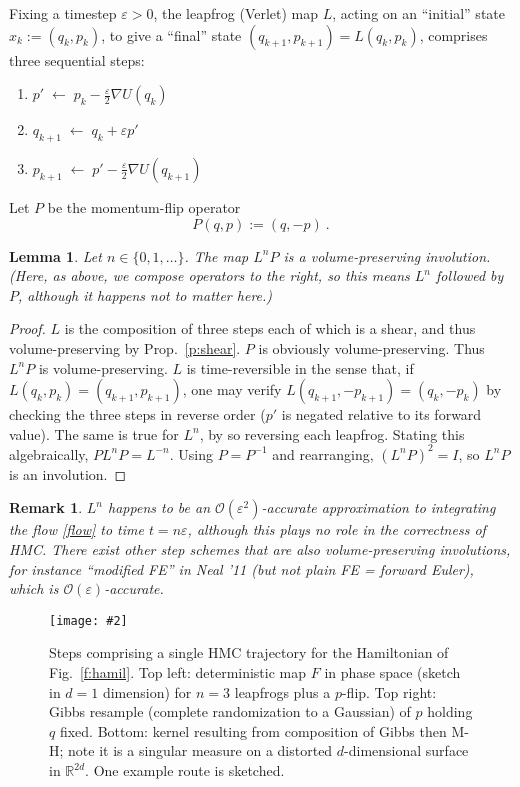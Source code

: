 \documentclass[10pt]{article}
\newcommand{\ben}{\begin{enumerate}}
\newcommand{\een}{\end{enumerate}}
\newcommand{\bfi}{\begin{figure}}
\newcommand{\efi}{\end{figure}}
\newcommand{\ca}[2]{\caption{#1 \label{#2}}}
\newcommand{\ig}[2]{\texttt{[image: \#2]}}
\newcommand{\R}{\mathbb{R}}
\newcommand{\bigO}{{\mathcal O}}
\newtheorem{lem}[thm]{Lemma}
\newtheorem{rmk}[thm]{Remark}
\newcommand{\eps}{\varepsilon}
\begin{document}
Fixing a timestep $\eps>0$, the leapfrog (Verlet) map $L$,
acting on an ``initial'' state $x_k:=(q_k,p_k)$,
to give a ``final'' state $(q_{k+1},p_{k+1}) = L(q_k,p_k)$,
comprises three sequential steps:
\ben
\item $p'     \;\leftarrow\; p_k - \frac{\eps}{2} \nabla U(q_k)$
\item $q_{k+1} \;\leftarrow\; q_k + \eps p'$
\item $p_{k+1} \;\leftarrow\; p' - \frac{\eps}{2} \nabla U(q_{k+1})$
\een
Let $P$ be the momentum-flip operator
$$
P(q,p) := (q,-p)~.
$$
\begin{lem}
  Let $n\in\{0,1,\dots\}$.
  The map $L^n P$ is a volume-preserving involution.
  (Here, as above, we compose operators to the right, so this
  means $L^n$ followed by $P$, although it happens not to
  matter here.)
  \label{l:LnP}
\end{lem}
\begin{proof}
  $L$ is the composition of three steps each of which is a shear, and thus
  volume-preserving by Prop.~\ref{p:shear}. $P$ is obviously volume-preserving.
  Thus $L^nP$ is volume-preserving.
  $L$ is time-reversible in the sense that, if $L(q_k,p_k)=(q_{k+1},p_{k+1})$,
  one may verify $L(q_{k+1},-p_{k+1})=(q_k,-p_k)$ by
  checking the three steps in reverse order ($p'$ is negated relative
  to its forward value).
  The same is true for $L^n$, by so reversing each leapfrog.
  Stating this algebraically, $PL^n P = L^{-n}$. Using $P=P^{-1}$ and
  rearranging, $(L^nP)^2 = I$, so $L^n P$ is an involution.
\end{proof}

\begin{rmk}
  $L^n$ happens to be
  an $\bigO(\eps^2)$-accurate approximation to integrating the
  flow \eqref{flow} to time $t = n\eps$,
  although this plays no role in the correctness of HMC.
  There exist other step schemes that are also volume-preserving involutions,
  for instance ``modified FE'' in Neal '11 (but not plain FE = forward Euler),
  which is $\bigO(\eps)$-accurate.
\end{rmk}


\bfi  %
\centering\ig{width=5in}{hmc.eps}
\ca{Steps comprising a single HMC trajectory for the Hamiltonian of Fig.~\ref{f:hamil}.
  Top left: deterministic map $F$ in phase space (sketch in $d=1$ dimension) for $n=3$ leapfrogs plus a $p$-flip.
  Top right: Gibbs resample (complete randomization to a Gaussian)
  of $p$ holding $q$ fixed.
  Bottom: kernel resulting from composition of Gibbs then M-H; note it is
  a singular measure on a distorted $d$-dimensional surface in $\R^{2d}$.
  One example route is sketched.}{f:hmc}
\efi
\end{document}
